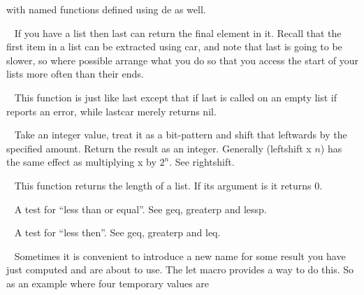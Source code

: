 \begin{description}
with named functions defined using {\tx de} as well.
\item[{\tx last~~~~~~~~~} \hspace{1cm} {\em function 1 arg}]~\newline
If you have a list then {\tx last} can return the final element in it. Recall
that the first item in a list can be extracted using {\tx car}, and note that
{\tx last} is going to be slower, so where possible arrange what you do so
that you access the start of your lists more often than their ends.
\item[{\tx lastcar~~~~~~} \hspace{1cm} {\em function 1 arg}]~\newline
This function is just like {\tx last} except that if {\tx last} is called on
an empty list if reports an error, while {\tx lastcar} merely returns nil.
\item[{\tx leftshift~~~~} \hspace{1cm} {\em function 2 args}]~\newline
Take an integer value, treat it as a bit-pattern and shift that leftwards
by the specified amount. Return the result as an integer. Generally
{\tx (leftshift x $n$)} has the same effect as multiplying {\tx x} by
$2^{n}$. See {\tx rightshift}.
\item[{\tx length~~~~~~~} \hspace{1cm} {\em function 1 arg}]~\newline
This function returns the length of a list. If its argument is \nil{} it returns
0.
\item[{\tx leq~~~~~~~~~~} \hspace{1cm} {\em function 2 args}]~\newline
A test for ``less than or equal''. See {\tx geq}, {\tx greaterp} and {\tx lessp}.
\item[{\tx lessp~~~~~~~~} \hspace{1cm} {\em function 2 args}]~\newline
A test for ``less then''. See {\tx geq}, {\tx greaterp} and {\tx leq}.
\item[{\tx let~~~~~~~~~~} \hspace{1cm} {\em macro}]~\newline
Sometimes it is convenient to introduce a new name for some result you
have just computed and are about to use. The {\tx let} macro provides
a way to do this. So as an example where four temporary values are

\end{description}
